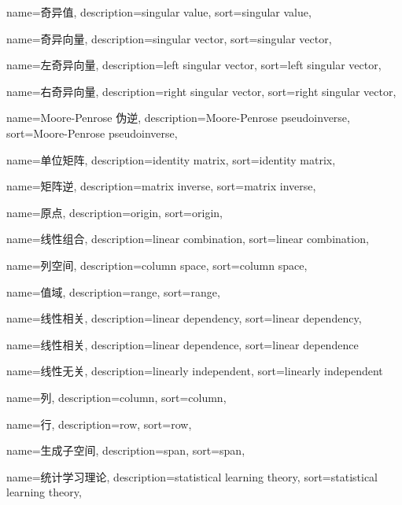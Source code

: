 {
  name=奇异值,
  description={singular value},
  sort={singular value},
}

{
  name=奇异向量,
  description={singular vector},
  sort={singular vector},
}

{
  name=左奇异向量,
  description={left singular vector},
  sort={left singular vector},
}

{
  name=右奇异向量,
  description={right singular vector},
  sort={right singular vector},
}

{
  name=Moore-Penrose 伪逆,
  description={Moore-Penrose pseudoinverse},
  sort={Moore-Penrose pseudoinverse},
}

{
  name=单位矩阵,
  description={identity matrix},
  sort={identity matrix},
}

{
  name=矩阵逆,
  description={matrix inverse},
  sort={matrix inverse},
}

{
  name=原点,
  description={origin},
  sort={origin},
}

{
  name=线性组合,
  description={linear combination},
  sort={linear combination},
}

{
  name=列空间,
  description={column space},
  sort={column space},
}

{
  name=值域,
  description={range},
  sort={range},
}

{
  name=线性相关,
  description={linear dependency},
  sort={linear dependency},
}

{
  name=线性相关,
  description={linear dependence},
  sort={linear dependence}
}

{
  name=线性无关,
  description={linearly independent},
  sort={linearly independent}
}

{
  name=列,
  description={column},
  sort={column},
}

{
  name=行,
  description={row},
  sort={row},
}

{
  name=生成子空间,
  description={span},
  sort={span},
}

{
  name=统计学习理论,
  description={statistical learning theory},
  sort={statistical learning theory},
}


